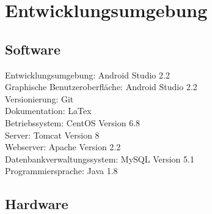 \section{Entwicklungsumgebung}

\subsection{Software}
Entwicklungsumgebung: 			Android Studio 2.2\\
Graphische Benutzeroberfläche: 	Android Studio 2.2\\
Versionierung: 					Git\\
Dokumentation:					LaTex\\
Betriebssystem: 				CentOS Version 6.8\\
Server:							Tomcat Version 8\\
Webserver:						Apache Version 2.2\\
Datenbankverwaltungssystem: 	MySQL Version 5.1\\
Programmiersprache:				Java 1.8\\

\subsection{Hardware}